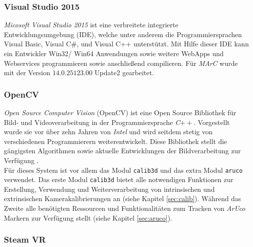\subsubsection{Visual Studio 2015}\label{sec:VisualStudio} 

\textit{Micosoft Visual Studio 2015} ist eine verbreitete integrierte Entwicklungsumgebung (IDE), welche unter anderem die Programmiersprachen Visual Basic, Visual C$\#$, und Visual C++ unterstützt. Mit Hilfe dieser IDE kann ein Entwickler Win32/ Win64 Anwendungen sowie weitere WebApps und Webservices \cite{website:VisuStud} programmieren sowie anschließend compilieren. Für \textit{MArC} wurde mit der Version $14.0.25123.00$ Update2 gearbeitet.

\subsubsection{OpenCV} \label{sec:OpenCV} 
\textit{Open Source Computer Vision} (OpenCV) ist eine Open Source Bibliothek für Bild- und Videoverarbeitung in der Programmiersprache \textit{C}$++$. Vorgestellt wurde sie vor über zehn Jahren von \textit{Intel} und wird seitdem stetig von verschiedenen Programmierern weiterentwickelt. Diese Bibliothek stellt die gängigsten Algorithmen sowie aktuelle Entwicklungen der Bildverarbeitung zur Verfügung
\cite{article:OpenCV}.\\
Für dieses System ist vor allem das Modul \texttt{calib3d} \cite{website:Calib3dDoc} und das extra Modul \texttt{aruco} \cite{website:ArucoDoc} verwendet. Das erste Modul \texttt{calib3d}  bietet alle notwendigen Funktionen zur Erstellung, Verwendung und Weiterverarbeitung von intrinsischen und extrinsischen Kamerakalibrierungen an (siehe Kapitel \ref{sec:calib}). Während das Zweite alle benötigten Ressourcen und Funktionalitäten zum Tracken von \textit{ArUco} Markern zur Verfügung stellt (siehe Kapitel \ref{sec:aruco}).


\subsubsection{Steam VR}
